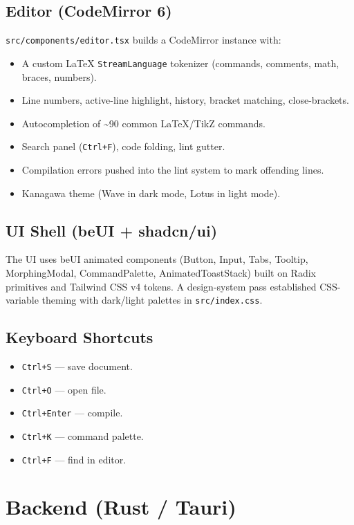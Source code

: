 \documentclass[11pt,a4paper]{report}
\begin{document}
\section{Editor (CodeMirror 6)}
\texttt{src/components/editor.tsx} builds a CodeMirror instance with:
\begin{itemize}
  \item A custom LaTeX \texttt{StreamLanguage} tokenizer (commands, comments, math, braces, numbers).
  \item Line numbers, active-line highlight, history, bracket matching, close-brackets.
  \item Autocompletion of \textasciitilde 90 common LaTeX/TikZ commands.
  \item Search panel (\texttt{Ctrl+F}), code folding, lint gutter.
  \item Compilation errors pushed into the lint system to mark offending lines.
  \item Kanagawa theme (Wave in dark mode, Lotus in light mode).
\end{itemize}

\section{UI Shell (beUI + shadcn/ui)}
The UI uses beUI animated components (Button, Input, Tabs, Tooltip, MorphingModal, CommandPalette, AnimatedToastStack) built on Radix primitives and Tailwind CSS v4 tokens. A design-system pass established CSS-variable theming with dark/light palettes in \texttt{src/index.css}.

\section{Keyboard Shortcuts}
\begin{itemize}
  \item \texttt{Ctrl+S} — save document.
  \item \texttt{Ctrl+O} — open file.
  \item \texttt{Ctrl+Enter} — compile.
  \item \texttt{Ctrl+K} — command palette.
  \item \texttt{Ctrl+F} — find in editor.
\end{itemize}

\chapter{Backend (Rust / Tauri)}
\end{document}

